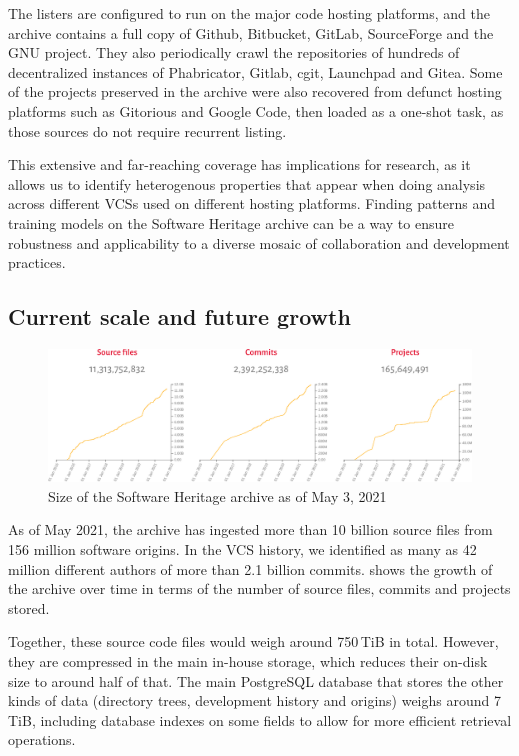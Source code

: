 The listers are configured to run on the major code hosting platforms, and the
archive contains a full copy of Github, Bitbucket, GitLab, SourceForge and the
GNU project. They also periodically crawl the repositories of hundreds of
decentralized instances of Phabricator, Gitlab, cgit, Launchpad and Gitea.
Some of the projects preserved in the archive were also recovered from defunct
hosting platforms such as Gitorious and Google Code, then loaded as a one-shot
task, as those sources do not require recurrent listing.

This extensive and far-reaching coverage has implications for research, as it
allows us to identify heterogenous properties that appear when doing analysis
across different \glspl{VCS} used on different hosting platforms. Finding
patterns and training models on the Software Heritage archive can be a way to
ensure robustness and applicability to a diverse mosaic of collaboration and
development practices.

\subsection{Current scale and future growth}

\begin{figure}
    \centering
    \includegraphics[width=0.9\linewidth]{../img/swh-size}
    \caption{Size of the Software Heritage archive as of May 3, 2021}%
    \label{fig:swh-size}
\end{figure}

As of May 2021, the archive has ingested more than 10 billion source files from
156 million software origins. In the \gls{VCS} history, we identified as many
as 42 million different authors of more than 2.1 billion commits.
 shows the growth of the archive over time in terms of the
number of source files, commits and projects stored.

Together, these source code files would weigh around 750\,TiB in total.
However, they are compressed in the main in-house storage, which reduces their
on-disk size to around half of that. The main
PostgreSQL database that stores the other kinds of data (directory trees,
development history and origins) weighs around 7\,TiB, including database
indexes on some fields to allow for more efficient retrieval operations.

